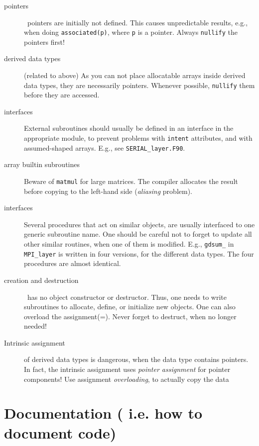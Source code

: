 \begin{description}
\item[pointers] \fort\ pointers are initially not defined. This causes
unpredictable results, e.g., when doing \verb=associated(p)=, where {\tt p}
is a pointer. Always \verb=nullify= the pointers first!

\item[derived data types] (related to above) As you can not place allocatable
arrays inside derived data types, they are necessarily
pointers. Whenever possible, {\tt nullify} them before they are
accessed.

\item[interfaces] External subroutines should usually be defined in an
interface in the appropriate module, to prevent problems with
\verb=intent= attributes, and with assumed-shaped arrays. E.g., see
{\tt SERIAL\_layer.F90}.

\item[array builtin subroutines] Beware of {\tt matmul} for large
matrices. The compiler allocates the result before copying to the
left-hand side ({\em aliasing} problem).

\item[interfaces] Several procedures that act on similar objects, are
usually interfaced to one generic subroutine name. One should be
careful not to forget to update all other similar routines, when one
of them is modified. E.g., {\tt gdsum\_} in {\tt MPI\_layer} is
written in four versions, for the different data types. The four
procedures are almost identical.

\item[creation and destruction] \fort\ has no object constructor or
destructor. Thus, one needs to write subroutines to allocate, define,
or initialize new objects. One can also overload the
assignment(=). Never forget to
destruct, when no longer needed!

\item[Intrinsic assignment] of derived data types is dangerous, when
the data type contains pointers. In fact, the intrinsic assignment
uses {\em pointer assignment} for pointer components!
 Use assignment {\em overloading}, to actually copy the data
\end{description}



\section{ Documentation ( i.e. how to document code) }

